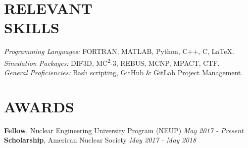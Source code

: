 \documentclass[margin, 10pt]{res}
\begin{document}
\begin{resume}

\section{RELEVANT \\ SKILLS}

{\sl Programming Languages:} FORTRAN, MATLAB, Python, C++, C, \LaTeX. \\
{\sl Simulation Packages:} DIF3D, MC\textsuperscript{2}-3, REBUS, MCNP, MPACT, 
  CTF. \\
{\sl General Proficiencies:} Bash scripting, GitHub \& GitLab Project 
  Management.

\section{AWARDS}
\textbf{Fellow}, Nuclear Engineering University Program (NEUP) \hfill 
  \textit{May 2017 - Present} \\
\textbf{Scholarship}, American Nuclear Society \hfill 
  \textit{May 2017 - May 2018}

\end{resume}
\end{document}

